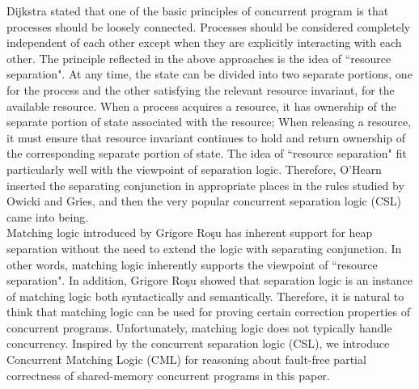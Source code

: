 \documentclass{lmcs} %
\theoremstyle{plain}\newtheorem{satz}[thm]{Satz} %
\begin{document}
Dijkstra\cite{dijkstra1968cooperating} stated that one of the basic principles of concurrent program is that processes should be loosely connected. Processes should be considered completely independent of each other except when they are explicitly interacting with each other. The principle reflected in the above approaches is the idea of ``resource separation". At any time, the state can be divided into two separate portions, one for the process and the other satisfying the relevant resource invariant, for the available resource. When a process acquires a resource, it has ownership of the separate portion of state associated with the resource; When releasing a resource, it must ensure that resource invariant continues to hold and return ownership of the corresponding separate portion of state. The idea of ``resource separation" fit particularly well with the viewpoint of separation logic. Therefore, O'Hearn inserted the separating conjunction in appropriate places in the rules studied by Owicki and Gries, and then the very popular concurrent separation logic (CSL) came into being.\\
Matching logic\cite{rosu2017matching}\cite{rocsu2010matching} introduced by Grigore Ro\c{s}u has inherent support for heap separation without the need to extend the logic with separating conjunction. In other words, matching logic inherently supports the viewpoint of ``resource separation". In addition, Grigore Ro\c{s}u showed that separation logic is an instance of matching logic both syntactically and semantically\cite{rosu2017matching}. Therefore, it is natural to think that matching logic can be used for proving certain correction properties of concurrent programs. Unfortunately, matching logic does not typically handle concurrency. Inspired by the concurrent separation logic (CSL), we introduce Concurrent Matching Logic (CML) for reasoning about fault-free partial correctness of shared-memory concurrent programs in this paper.\\
\end{document}
